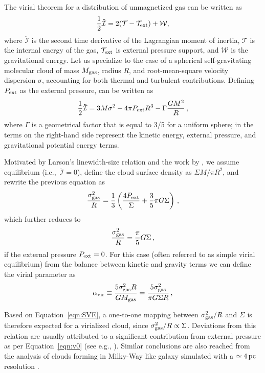 \IfFileExists{emulateapjlegacy.cls}{\documentclass[iop]{emulateapjlegacy}}{\documentclass[iop]{emulateapj}}
\begin{document}
The virial theorem for a distribution of unmagnetized gas can be written as \citep{McKee92a}
\begin{equation}\label{eqn:virial_th_general}
\frac{1}{2}\ddot{\mathcal{I}} = 2(\mathcal{T} - \mathcal{T}_{\rm ext}) + \mathcal{W},
\end{equation}
where $\ddot{\mathcal{I}}$ is the second time derivative of the Lagrangian moment of inertia, $\mathcal{T}$ is the internal energy of the gas, $\mathcal{T}_{\rm ext}$ is external pressure support, and $\mathcal{W}$ is the gravitational energy.
%
Let us specialize to the case of a spherical self-gravitating molecular cloud of mass $M_{\rm gas}$, radius $R$, and root-mean-square velocity dispersion $\sigma$, accounting for both thermal and turbulent contributions.
Defining $P_{\rm ext}$ as the external pressure,  can be written as
\begin{equation}
\frac{1}{2}{\ddot{\mathcal{I}}} = 3 M \sigma^2 - 4\pi P_{\rm ext} R^3 - \Gamma\frac{GM^2}{R}\,,
\label{eqn:virial}
\end{equation}
where $\Gamma$ is a geometrical factor that is equal to 3/5 for a uniform sphere; in  the terms on the right-hand side represent the kinetic energy, external pressure, and gravitational potential energy terms.

Motivated by Larson's linewidth-size relation \citep{Larson81a} and the work by \citet{Heyer09a}, we assume equilibrium (i.e.,\ ${\ddot{\mathcal{I}}}=0$), define the cloud surface density as
$\Sigma$\eq$M/\pi R^2$, and rewrite the previous equation as
\begin{equation}
\frac{\sigma_{\rm gas}^2}{R} = \frac{1}{3}\left(\frac{4P_{\rm ext}}{\Sigma} + \frac{3}{5} \pi G \Sigma \right)\,,
\label{eqn:v0}
\end{equation}
which further reduces to
\begin{equation}
\frac{\sigma_{\rm gas}^2}{R} = \frac{\pi}{5} G \Sigma\,,
\label{eqn:SVE}
\end{equation}
if the external pressure $P_{\rm ext}=0$. For this case (often referred to as simple virial equilibrium) from the balance between kinetic and gravity terms we can define the virial parameter as
\begin{equation}
\alpha_{\rm vir} \equiv  \frac{5\sigma_{\rm gas}^2R}{GM_{\rm gas}} = \frac{5\sigma_{\rm gas}^2}{\pi G \Sigma R}\,,
\label{eqn:alpha}
\end{equation}

Based on Equation~\ref{eqn:SVE}, a one-to-one mapping between $\sigma_{\rm gas}^2/R$ and $\Sigma$ is therefore expected for a virialized cloud, since $\sigma_{\rm gas}^2/R\propto\Sigma$. Deviations from this relation are usually attributed to a significant contribution from external pressure as per Equation~\ref{eqn:v0} (see e.g., \citealt{Heyer09a, Hughes10a, Hughes13b, Meidt13a}). Similar conclusions are also reached from the analysis of clouds forming in Milky-Way like galaxy simulated with a $\simeq 4\,{\rm pc}$ resolution \citep[i.e.][]{grisdale:2018}.
\end{document}
